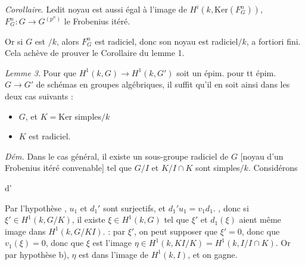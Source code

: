 \documentclass[11pt,a4paper]{article}
\begin{document}



\emph{Corollaire}. Ledit noyau est aussi égal à l'image de
$H^i(k, \mathrm{Ker}(F_G^n))$, $F_G^n : G \to G^{(p^n)}$ le Frobenius itéré.

Or si $G$ est $/k$, alors $F_G^n$ est radiciel, donc son
noyau est radiciel$/k$, a fortiori fini. Cela achève de prouver le
Corollaire du lemme 1.

\emph{Lemme 3}. Pour que $H^1(k,G) \to H^1(k,G')$ soit un épim.
pour tt épim.\ $G \to G'$ de schémas en groupes algébriques, il suffit
qu'il en soit ainsi dans les deux cas suivants :
\begin{itemize}
  \item[a)] $G$, \struck{\ill{}} et $K = \mathrm{Ker}$ 
  \struck{\ill{}} simples$/k$
  \item[b)] $K$ est radiciel.
\end{itemize}

\emph{Dém.} Dans le cas général, il
 existe un  sous-groupe radiciel  de $G$ [noyau d'un Frobenius itéré
convenable] tel que $G/I$ \struck{\ill{}} et $K/I \cap K$ sont simples$/k$.
Considérons


 d'\ill{}



Par l'hypothèse , $u_1$ et $d_1'$ sont surjectifs, et
$d_1' u_1 = v_1 d_1$. \ill{}, donc si $\xi' \in H^1(k, G/K)$, il
existe $\xi \in H^1(k,G)$ tel que $\xi'$ et $d_1(\xi)$
aient même image dans $H^1(k, G/KI)$. \ill{} :  par
$\xi'$, on peut supposer que $\xi' = 0$, donc
que $v_1(\xi) = 0$, donc que $\xi$ est \struck{\ill{}} l'image 
$\eta \in H^1(k, KI/K) = H^1(k, I/I \cap K)$. Or par hypothèse b),
\struck{\ill{}} $\eta$ est dans l'image de $H^1(k,I)$, et on gagne.
\end{document}
